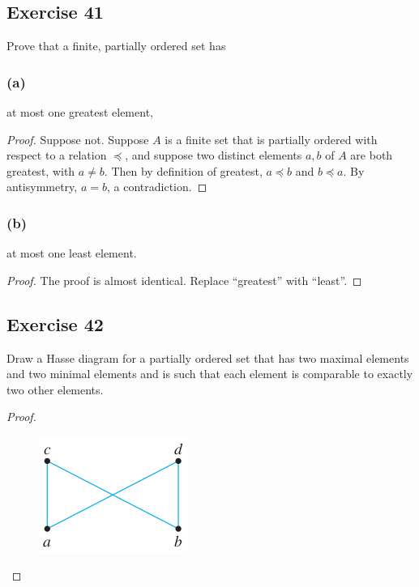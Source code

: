 \documentclass[14pt]{extarticle}
\begin{document}
\subsection{Exercise 41}
Prove that a finite, partially ordered set has

\subsubsection{(a)}
at most one greatest element,

\begin{proof}
        Suppose not. Suppose $A$ is a finite set that is partially ordered with respect to a relation \(\preceq\), and suppose
        two distinct elements \(a, b\) of $A$ are both greatest, with \(a \neq b\). Then by definition of greatest, \(a
        \preceq b\) and \(b \preceq a\). By antisymmetry, \(a = b\), a contradiction.
\end{proof}

\subsubsection{(b)}
at most one least element.

\begin{proof}
        The proof is almost identical. Replace ``greatest'' with ``least''.
\end{proof}

\subsection{Exercise 42}
Draw a Hasse diagram for a partially ordered set that has two maximal elements and two minimal elements and is such
that each element is comparable to exactly two other elements.

\begin{proof}
        \begin{figure}[ht!]
                \centering
                \includegraphics[scale=0.5]{../images/8.5.42.png}
        \end{figure}
\end{proof}
\end{document}

